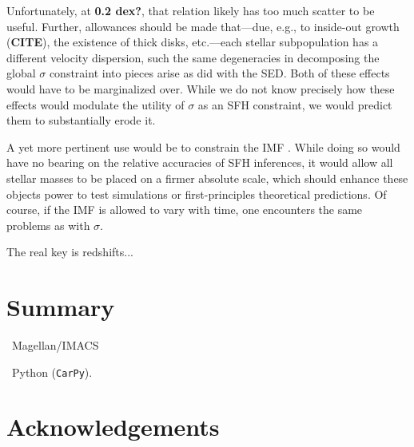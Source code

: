 \documentclass[a4paper,fleqn,usenatbib]{mnras}
\newcommand{\bfr}{\bf\color{red}}
\newcommand{\CITE}{{\bfr CITE}}
\newcommand{\facilities}{{\it Facilities:}}
\newcommand{\software}{{\it Software:}}
\begin{document}
Unfortunately, at {\bfr 0.2 dex?}, that relation likely has too much scatter to be useful. Further,
allowances should be made that---due, e.g., to inside-out growth (\CITE), the existence of thick disks, 
etc.---each stellar subpopulation has a different velocity dispersion, such the same degeneracies in
decomposing the global $\sigma$ constraint into pieces arise as did with the SED. Both of these 
effects would have to be marginalized over. While we do not know precisely how these effects 
would modulate the utility of $\sigma$ as an SFH constraint, we would predict them to 
substantially erode it.

A yet more pertinent use would be to constrain the IMF \citep{Conroy12}. While doing so 
would have no bearing on the relative accuracies of SFH inferences, it would allow all stellar 
masses to be placed on a firmer absolute scale, which should enhance these objects power to test 
simulations or first-principles theoretical predictions. Of course, if the IMF is allowed to vary with 
time, one encounters the same problems as with $\sigma$.

The real key is redshifts...



\section{Summary}
\label{sec:summary}



\noindent\facilities\ Magellan/IMACS

\noindent\software\ Python (\texttt{CarPy}).%


\section*{Acknowledgements}
\end{document}

